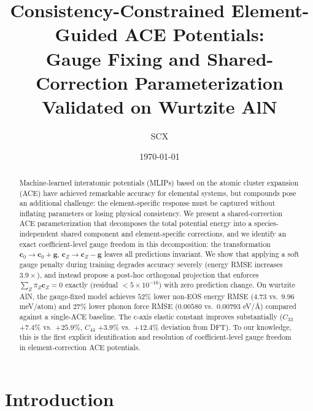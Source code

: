 \documentclass[twoside,prb,aps,floatfix,superscriptaddress,longbibliography]{revtex4-2}
\begin{document}
\title{Consistency-Constrained Element-Guided ACE Potentials: \\
Gauge Fixing and Shared-Correction Parameterization \\
Validated on Wurtzite AlN}

\author{SCX}

\date{\today}

\begin{abstract}
Machine-learned interatomic potentials (MLIPs) based on the atomic cluster expansion (ACE) have achieved remarkable accuracy for elemental systems, but compounds pose an additional challenge: the element-specific response must be captured without inflating parameters or losing physical consistency. We present a shared-correction ACE parameterization that decomposes the total potential energy into a species-independent shared component and element-specific corrections, and we identify an exact coefficient-level gauge freedom in this decomposition: the transformation $\mathbf{c}_0 \to \mathbf{c}_0 + \mathbf{g}$, $\mathbf{c}_Z \to \mathbf{c}_Z - \mathbf{g}$ leaves all predictions invariant. We show that applying a soft gauge penalty during training degrades accuracy severely (energy RMSE increases $3.9\times$), and instead propose a post-hoc orthogonal projection that enforces $\sum_Z \pi_Z \mathbf{c}_Z = 0$ exactly (residual $< 5\times10^{-16}$) with zero prediction change. On wurtzite AlN, the gauge-fixed model achieves $52\%$ lower non-EOS energy RMSE ($4.73$ vs.\ $9.96$ meV/atom) and $27\%$ lower phonon force RMSE ($0.00580$ vs.\ $0.00793$ eV/{\AA}) compared against a single-ACE baseline. The c-axis elastic constant improves substantially ($C_{33}$ $+7.4\%$ vs.\ $+25.9\%$, $C_{44}$ $+3.9\%$ vs.\ $+12.4\%$ deviation from DFT). To our knowledge, this is the first explicit identification and resolution of coefficient-level gauge freedom in element-correction ACE potentials.
\end{abstract}

\maketitle

\section{Introduction}
\label{sec:intro}
\end{document}
